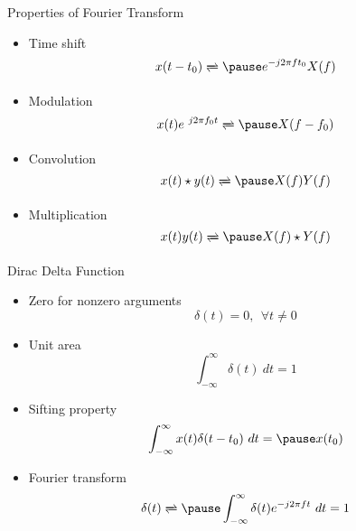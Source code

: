 \documentclass[t]{beamer}
\begin{document}
\begin{frame}{Properties of Fourier Transform}
  \begin{itemize}
    \item Time shift
      \begin{equation*}
        x(t-t_0) \xrightleftharpoons{} \pause e^{-j2\pi ft_0} X(f)
      \end{equation*}
    \pause
    \item Modulation
      \begin{equation*}
        x(t)e^{\ j2\pi f_0t} \xrightleftharpoons{} \pause X(f-f_0)
      \end{equation*}
    \pause
    \item Convolution
      \begin{equation*}
        x(t)\star y(t) \xrightleftharpoons{} \pause X(f)Y(f)
      \end{equation*}
    \pause
    \item Multiplication
      \begin{equation*}
        x(t)y(t) \xrightleftharpoons{} \pause X(f)\star Y(f)
      \end{equation*}
  \end{itemize}
\end{frame}


\begin{frame}{Dirac Delta Function}
  \begin{itemize}
    \item \pause Zero for nonzero arguments
      \begin{equation*}
        \delta(t) = 0, \ \ \forall t \neq 0
      \end{equation*}
    \item \pause Unit area
      \begin{equation*}
        \int_{-\infty}^{\infty} \delta(t)\ dt = 1
      \end{equation*}
    \item \pause Sifting property
      \begin{equation*}
        \int_{-\infty}^{\infty}x(t) \delta(t-t_0)\ dt = \pause x(t_0)
      \end{equation*}
    \pause
    \item Fourier transform
      \begin{equation*}
        \delta(t) \xrightleftharpoons{} \pause \int_{-\infty}^{\infty} \delta(t)e^{-j2\pi ft}\ dt = 1
      \end{equation*}
  \end{itemize}
\end{frame}
\end{document}
